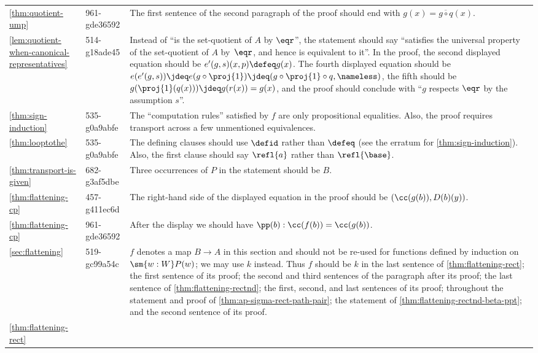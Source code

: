 \documentclass[
%
%
11pt %
]{article}
\begin{document}
\begin{longtable}{llp{10.5cm}}
  \cref{thm:quotient-ump}
  & 961-gde36592
  & The first sentence of the second paragraph of the proof should end with $g(x) = \overline{g\circ q}(x)$.\\
  \cref{lem:quotient-when-canonical-representatives}
  & 514-g18ade45
  & Instead of ``is the set-quotient of $A$ by $\eqr$'', the statement should say ``satisfies the universal property of the set-quotient of $A$ by~$\eqr$, and hence is equivalent to it''.
  In the proof, the second displayed equation should be $e'(g, s) (x,p) \defeq g(x)$.
  The fourth displayed equation should be $e(e'(g, s)) \jdeq e(g \circ \proj{1}) \jdeq (g \circ \proj{1} \circ q, {\nameless})$, the fifth should be $g(\proj{1}(q(x))) \jdeq g(r(x)) = g(x)$, and the proof should conclude with ``$g$ respects $\eqr$ by the assumption $s$''.\\
  \cref{thm:sign-induction}
  & 535-g0a9abfe
  & The ``computation rules'' satisfied by $f$ are only propositional equalities.
  Also, the proof requires transport across a few unmentioned equivalences.\\
  \cref{thm:looptothe}
  & 535-g0a9abfe
  & The defining clauses should use $\defid$ rather than $\defeq$ (see the erratum for \cref{thm:sign-induction}).
  Also, the first clause should say $\refl{a}$ rather than $\refl{\base}$.\\
  \cref{thm:transport-is-given}
  & 682-g3af5dbe
  & Three occurrences of $P$ in the statement should be $B$.\\
  \cref{thm:flattening-cp}
  & 457-g411ec6d
  & The right-hand side of the displayed equation in the proof should be $(\cc(g(b)),D(b)(y))$.\\
  \cref{thm:flattening-cp}
  & 961-gde36592
  & After the display we should have $\pp(b):\cc(f(b))=\cc(g(b))$.\\
  \cref{sec:flattening}
  & 519-gc99a54c
  & $f$ denotes a map $B\to A$ in this section and should not be re-used for functions defined by induction on $\sm{w:W} P(w)$; we may use $k$ instead.
  Thus $f$ should be $k$ in the last sentence of \cref{thm:flattening-rect}; the first sentence of its proof; the second and third sentences of the paragraph after its proof; the last sentence of \cref{thm:flattening-rectnd}; the first, second, and last sentences of its proof; throughout the statement and proof of \cref{thm:ap-sigma-rect-path-pair}; the statement of \cref{thm:flattening-rectnd-beta-ppt}; and the second sentence of its proof.\\
  \cref{thm:flattening-rect}

\end{longtable}
\end{document}
